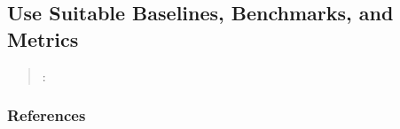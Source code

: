 



\subsection{Use Suitable Baselines, Benchmarks, and Metrics}
\label{sec:use-suitable-baselines-benchmarks-and-metrics}

\begin{quote}
\summary: 
\end{quote}



\subsubsection{References}





